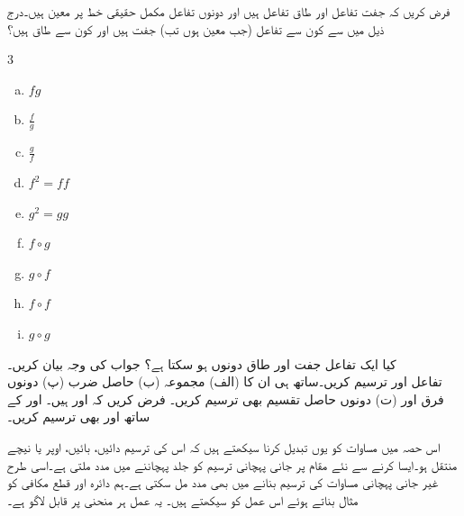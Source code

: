 فرض کریں کہ  جفت تفاعل اور  طاق تفاعل  ہیں  اور دونوں تفاعل مکمل حقیقی خط  پر معین ہیں۔درج ذیل میں سے کون سے تفاعل (جب معین ہوں تب) جفت ہیں اور کون سے طاق ہیں؟
\begin{multicols}{3}
\begin{enumerate}[a.]
\item
$fg$
\item
$\frac{f}{g}$
\item
$\frac{g}{f}$
\item
$f^2=ff$
\item
$g^2=gg$
\item
$f\circ g$
\item
$g\circ f$
\item
$f\circ f$
\item
$g \circ g$
\end{enumerate}
\end{multicols}
کیا ایک تفاعل جفت اور طاق دونوں ہو سکتا ہے؟ جواب کی وجہ بیان کریں۔
\\

تفاعل  اور  ترسیم کریں۔ساتھ ہی ان کا (الف) مجموعہ (ب) حاصل ضرب (پ) دونوں فرق اور (ت) دونوں حاصل تقسیم  بھی ترسیم کریں۔
فرض کریں کہ  اور  ہیں۔ اور  کے ساتھ  اور   بھی ترسیم کریں۔


اس حصہ میں مساوات کو یوں تبدیل کرنا سیکھتے ہیں کہ اس کی ترسیم دائیں، بائیں، اوپر یا نیچے منتقل ہو۔ایسا کرنے سے  نئے مقام پر جانی پہچانی ترسیم کو جلد پہچاننے میں مدد ملتی ہے۔اسی طرح غیر جانی پہچانی مساوات کی  ترسیم بنانے میں بھی مدد مل سکتی  ہے۔ہم دائرہ اور قطع مکافی کو مثال بناتے ہوئے اس عمل کو سیکھتے ہیں۔ یہ عمل ہر منحنی  پر  قابل لاگو ہے۔
  
